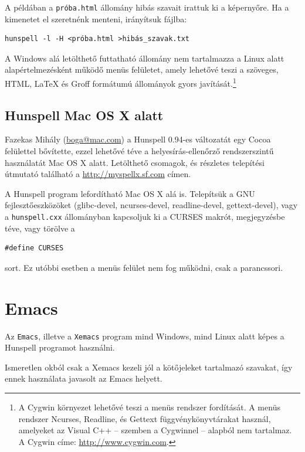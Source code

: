 A példában a \texttt{próba.html} állomány hibás szavait
irattuk ki a képernyőre. Ha a kimenetet el szeretnénk
menteni, irányítsuk fájlba:

\begin{verbatim}
hunspell -l -H <próba.html >hibás_szavak.txt
\end{verbatim}

A Windows alá letölthető futtatható állomány nem tartalmazza
a Linux alatt alapértelmezésként működő menüs felületet, amely
lehetővé teszi a szöveges, \textsc{HTML}, \LaTeX{} és
Groff formátumú állományok gyors javítását.\footnote{A Cygwin
környezet lehetővé teszi a menüs rendszer fordítását.
A menüs rendszer Ncurses, Readline,
és Gettext függvénykönyvtárakat használ, amelyeket az Visual C++
-- szemben a Cygwinnel -- alapból nem tartalmaz.
A Cygwin címe: \url{http://www.cygwin.com}.
}


\subsection{Hunspell Mac OS X alatt}

Fazekas Mihály (\url{boga@mac.com}) a
Hunspell 0.94-es változatát egy Cocoa felülettel bővítette,
ezzel lehetővé téve a helyesírás-ellenőrző rendszerszintű
használatát Mac OS X alatt. Letölthető csomagok, és részletes telepítési
útmutató található a \url{http://myspellx.sf.com} címen.

A Hunspell program lefordítható Mac OS X alá is. Telepítsük
a GNU fejlesztőeszközöket (glibc-devel, ncurses-devel,
readline-devel, gettext-devel), vagy a \texttt{hunspell.cxx}
állományban kapcsoljuk ki a \textsc{CURSES} makrót, megjegyzésbe
téve, vagy törölve a

\begin{verbatim}
#define CURSES
\end{verbatim}

sort. Ez utóbbi esetben a menüs felület nem fog működni, csak
a parancssori.


\section{Emacs}

Az \texttt{Emacs}, illetve a \texttt{Xemacs} program mind Windows,
mind Linux alatt képes a Hunspell programot használni.

Ismeretlen okból csak a Xemacs kezeli jól
a kötőjeleket tartalmazó szavakat, így ennek használata
javasolt az Emacs helyett.


